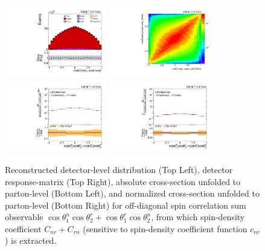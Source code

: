 \clearpage
\begin{figure}[htb]
\begin{center}
 \includegraphics[width=0.40\textwidth]{fig_fullRun2UL/controlplots/combined/Hyp_LLBarCPnr.pdf}
 \includegraphics[width=0.40\textwidth]{fig_fullRun2UL/unfolding/combined/ResponseMatrix_c_Pnr.pdf} \\
 \includegraphics[width=0.40\textwidth]{fig_fullRun2UL/unfolding/combined/UnfoldedResults_c_Pnr.pdf}
 \includegraphics[width=0.40\textwidth]{fig_fullRun2UL/unfolding/combined/UnfoldedResultsNorm_c_Pnr.pdf} \\
\label{fig:c_Pnr}
\caption{Reconstructed detector-level distribution (Top Left), detector response-matrix (Top Right), absolute cross-section unfolded to parton-level (Bottom Left), and normalized cross-section unfolded to parton-level (Bottom Right) for off-diagonal spin correlation sum observable $\cos\theta_{1}^{n}\cos\theta_{2}^{r}+\cos\theta_{1}^{r}\cos\theta_{2}^{n}$, from which spin-density coefficient $C_{nr}+C_{rn}$ (sensitive to spin-density coefficient function $c_{n r}$) is extracted.}
\end{center}
\end{figure}
